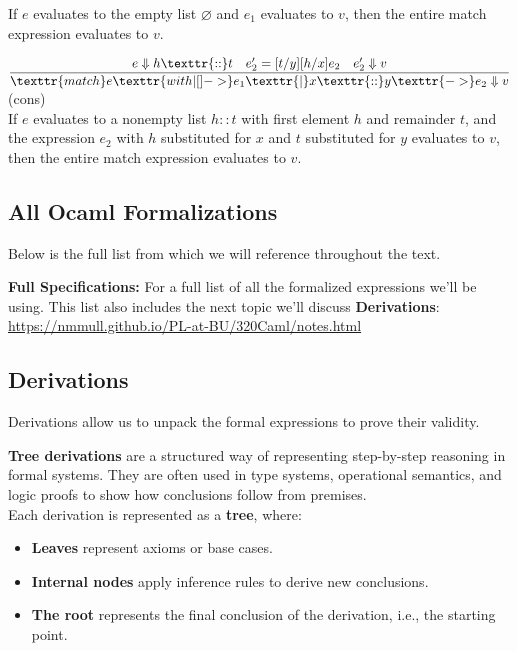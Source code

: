 \begin{Def}
\begin{itemize}
            \noindent
            If $e$ evaluates to the empty list $\varnothing$ and $e_1$ evaluates to $v$, then the entire match expression evaluates to $v$.

        \LARGE 
            $\dfrac{e \Downarrow h \texttr{ :: } t \quad e'_2 = [t/y][h/x]e_2 \quad e'_2 \Downarrow v}
            {\texttr{match } e \texttr{ with | [] -> } e_1 \texttr{| } x \texttr{ :: } y \texttr{ -> } e_2 \Downarrow v}$ (cons) \normalsize\\
            
            \noindent
            If $e$ evaluates to a nonempty list $h::t$ with first element $h$ and remainder $t$, and the expression $e_2$ with $h$ substituted for $x$ and $t$ substituted for $y$ evaluates to $v$, then the entire match expression evaluates to $v$.
       
    \end{itemize}
\end{Def}

\noindent
\subsection{All Ocaml Formalizations}
\noindent Below is the full list from which we will reference throughout the text.
\begin{gbox}
    \textbf{Full Specifications:} For a full list of all the formalized expressions we'll be using. This list 
    also includes the next topic we'll discuss \textbf{Derivations}:\\
    \href{https://nmmull.github.io/PL-at-BU/320Caml/notes.html}{https://nmmull.github.io/PL-at-BU/320Caml/notes.html}
\end{gbox}

\newpage

\subsection{Derivations}

\noindent
Derivations allow us to unpack the formal expressions to prove their validity.
\begin{Def}

    \textbf{Tree derivations} are a structured way of representing step-by-step reasoning in formal systems. They are often used in type systems, operational semantics, and logic proofs to show how conclusions follow from premises.\\

    \noindent
    Each derivation is represented as a \textbf{tree}, where:
    \begin{itemize}
        \item \textbf{Leaves} represent axioms or base cases.
        \item \textbf{Internal nodes} apply inference rules to derive new conclusions.
        \item \textbf{The root} represents the final conclusion of the derivation, i.e., the starting point.
    \end{itemize}
\end{Def}

